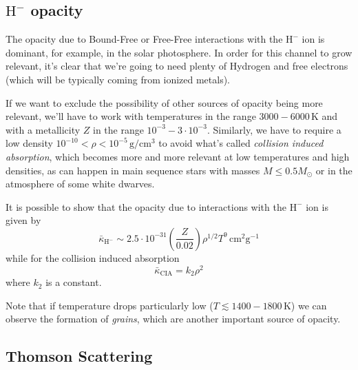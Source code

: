 \subsection{$\text{H}^{-}$ opacity}

The opacity due to Bound-Free or Free-Free interactions with the $\text{H}^{-}$ ion is dominant, for example, in the solar photosphere. In order for this channel to grow relevant, it's clear that we're going to need plenty of Hydrogen and free electrons (which will be typically coming from ionized metals).
\par If we want to exclude the possibility of other sources of opacity being more relevant, we'll have to work with temperatures in the range $3000-6000\,\text{K}$ and with a metallicity $Z$ in the range $10^{-3}-3\cdot 10^{-3}$. Similarly, we have to require a low density $10^{-10}<\rho<10^{-5}\,\text{g}/\text{cm}^{3}$ to avoid what's called \emph{collision induced absorption}, which becomes more and more relevant at low temperatures and high densities, as can happen in main sequence stars with masses $M \leq 0.5M_{\odot}$ or in the atmosphere of some white dwarves.
\par It is possible to show that the opacity due to interactions with the $\text{H}^{-}$ ion is given by
\begin{equation}
	\bar{\kappa}_{\text{H}^{-}} \sim 2.5\cdot 10^{-31}\left(\frac{Z}{0.02}\right)\rho^{1/2}T^{9}\,\text{cm}^{2}\text{g}^{-1}
	\label{eq:hydrogenopacity}
\end{equation}
while for the collision induced absorption
\begin{equation}
	\bar{\kappa}_{\text{CIA}} = k_{2}\rho^{2}
	\label{eq:ciaopacity}
\end{equation}
where $k_{2}$ is a constant.
\par Note that if temperature drops particularly low ($T \lesssim 1400-1800\,\text{K}$) we can observe the formation of \emph{grains}, which are another important source of opacity.

\subsection{Thomson Scattering}

